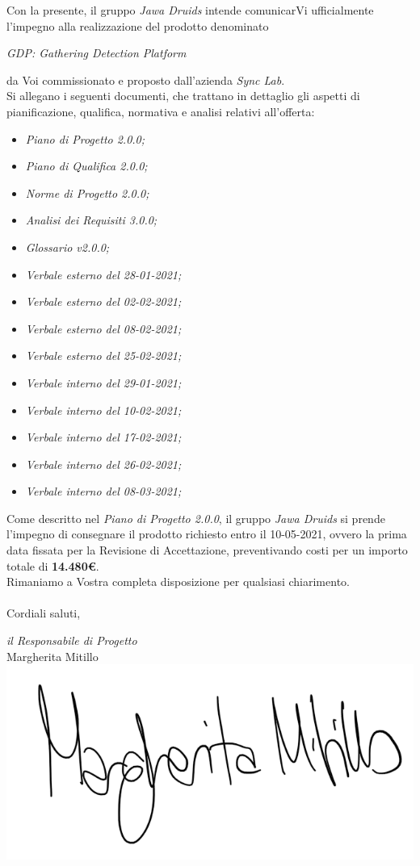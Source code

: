 \documentclass[a4paper,12pt]{report}
\begin{document}
Con la presente, il gruppo \textit{Jawa Druids} intende comunicarVi ufficialmente l’impegno alla realizzazione del prodotto denominato
\begin{center}
  \textit{GDP: Gathering Detection Platform}
\end{center}
da Voi commissionato e proposto dall'azienda \textit{Sync Lab}.
\vspace{1cm}
\\
Si allegano i seguenti documenti, che trattano in dettaglio gli aspetti di pianificazione, qualifica, normativa e analisi relativi all'offerta:
\begin{itemize}
  \item \textit{Piano di Progetto 2.0.0;}
  \item \textit{Piano di Qualifica 2.0.0;}
  \item \textit{Norme di Progetto 2.0.0;}
  \item \textit{Analisi dei Requisiti 3.0.0;}
  \item \textit{Glossario v2.0.0;}
  \item \textit{Verbale esterno del 28-01-2021;}
  \item \textit{Verbale esterno del 02-02-2021;}
  \item \textit{Verbale esterno del 08-02-2021;}
  \item \textit{Verbale esterno del 25-02-2021;}
  \item \textit{Verbale interno del 29-01-2021;}
  \item \textit{Verbale interno del 10-02-2021;}
  \item \textit{Verbale interno del 17-02-2021;}
  \item \textit{Verbale interno del 26-02-2021;}
  \item \textit{Verbale interno del 08-03-2021;}
\end{itemize}
\vspace{0.7cm}

Come descritto nel \textit{Piano di Progetto 2.0.0}, il gruppo \textit{Jawa Druids} si prende l’impegno di consegnare il prodotto richiesto entro il 10-05-2021, ovvero la prima data fissata per la Revisione di Accettazione, preventivando costi per un importo totale di \textbf{14.480\euro}.\\
Rimaniamo a Vostra completa disposizione per qualsiasi chiarimento.\\
\vspace{0.3cm}
\\
Cordiali saluti,
\begin{flushright}
  \textit{il Responsabile di Progetto} \\
  Margherita Mitillo \\
  \includegraphics[width=0.3\linewidth]{immagini/firme/firma_margherita.png}\\[4ex]
\end{flushright}
\end{document}
